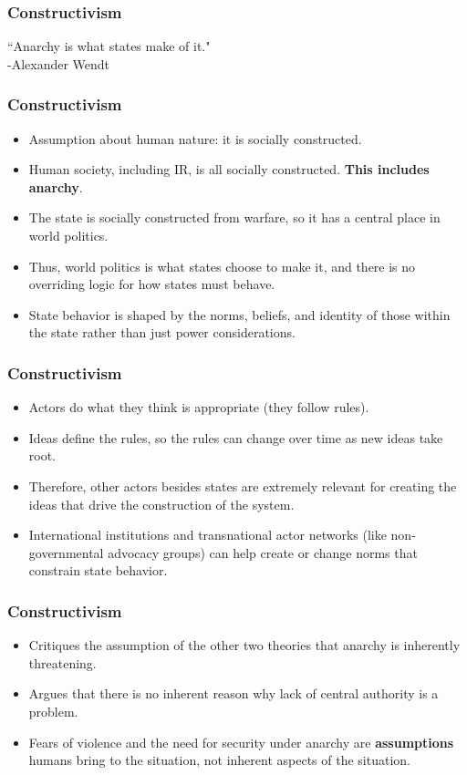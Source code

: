 \documentclass{beamer}
\begin{document}

\begin{frame} 
\frametitle{\LARGE{Constructivism}}
``Anarchy is what states make of it." \\
\hspace*{160pt} -Alexander Wendt
\end{frame}


\begin{frame} 
\frametitle{\LARGE{Constructivism}}
\begin{itemize}
    \item Assumption about human nature: it is socially constructed. \pause 
    \item Human society, including IR, is all socially constructed. \textbf{This includes anarchy}. \pause
    \item The state is socially constructed from warfare, so it has a central place in world politics. \pause
    \item Thus, world politics is what states choose to make it, and there is no overriding logic for how states must behave. \pause 
    \item State behavior is shaped by the norms, beliefs, and identity of those within the state rather than just power considerations.
\end{itemize}
\end{frame}

\begin{frame} 
\frametitle{\LARGE{Constructivism}}
    \begin{itemize}
        \item Actors do what they think is appropriate (they follow rules). \pause 
        \item Ideas define the rules, so the rules can change over time as new ideas take root. \pause 
        \item Therefore, other actors besides states are extremely relevant for creating the ideas that drive the construction of the system. \pause
        \item International institutions and transnational actor networks (like non-governmental advocacy groups) can help create or change norms that constrain state behavior.
    \end{itemize}
\end{frame}

\begin{frame} 
	\frametitle{\LARGE{Constructivism}}
	\begin{itemize}
		\item Critiques the assumption of the other two theories that anarchy is inherently threatening.
		\item Argues that there is no inherent reason why lack of central authority is a problem. \pause
		\item Fears of violence and the need for security under anarchy are \textbf{assumptions} humans bring to the situation, not inherent aspects of the situation. 
	\end{itemize}
\end{frame}
\end{document}
